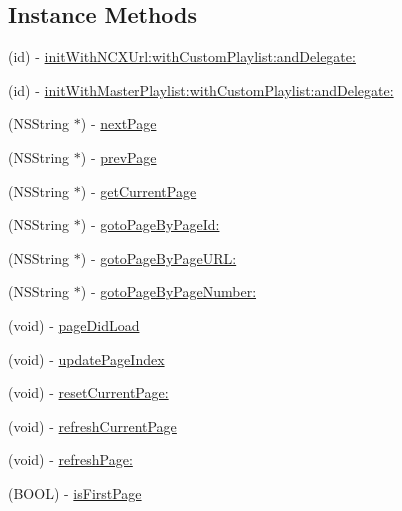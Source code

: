 \subsection*{Instance Methods}
\begin{DoxyCompactItemize}
\item 
(id) -\/ \hyperlink{interface_pxe_player_page_manager_a8f9edd477523edd9403157d3ec4d9272}{init\-With\-N\-C\-X\-Url\-:with\-Custom\-Playlist\-:and\-Delegate\-:}
\item 
(id) -\/ \hyperlink{interface_pxe_player_page_manager_a1acb70790e9716c43ec76ead84660df5}{init\-With\-Master\-Playlist\-:with\-Custom\-Playlist\-:and\-Delegate\-:}
\item 
(N\-S\-String $\ast$) -\/ \hyperlink{interface_pxe_player_page_manager_a2bcb750b8adc89ba486a938a2cd41912}{next\-Page}
\item 
(N\-S\-String $\ast$) -\/ \hyperlink{interface_pxe_player_page_manager_a537e1ae0451bb4bd2505567dd131c0cf}{prev\-Page}
\item 
(N\-S\-String $\ast$) -\/ \hyperlink{interface_pxe_player_page_manager_a498ec415cdee48cf98d3987b27d1e255}{get\-Current\-Page}
\item 
(N\-S\-String $\ast$) -\/ \hyperlink{interface_pxe_player_page_manager_a424c106ea5215cdc09717245ebea3550}{goto\-Page\-By\-Page\-Id\-:}
\item 
(N\-S\-String $\ast$) -\/ \hyperlink{interface_pxe_player_page_manager_aa936790b8353f99bd80ab0a103a617cc}{goto\-Page\-By\-Page\-U\-R\-L\-:}
\item 
(N\-S\-String $\ast$) -\/ \hyperlink{interface_pxe_player_page_manager_a8df6da237f836f15071bb4f89d6341ee}{goto\-Page\-By\-Page\-Number\-:}
\item 
(void) -\/ \hyperlink{interface_pxe_player_page_manager_a3bc250a6d660a4bc896d3a4246acb71a}{page\-Did\-Load}
\item 
(void) -\/ \hyperlink{interface_pxe_player_page_manager_a29541675ce1b0d7ad4eebe09911ad110}{update\-Page\-Index}
\item 
(void) -\/ \hyperlink{interface_pxe_player_page_manager_a280a0550516439315df7c060e55cb381}{reset\-Current\-Page\-:}
\item 
(void) -\/ \hyperlink{interface_pxe_player_page_manager_a8601082d8343001cc1a83ba95c01dc2b}{refresh\-Current\-Page}
\item 
(void) -\/ \hyperlink{interface_pxe_player_page_manager_a84ea3e77704e458a85e6fb141eab5802}{refresh\-Page\-:}
\item 
(B\-O\-O\-L) -\/ \hyperlink{interface_pxe_player_page_manager_a5a1c671b75d0ce7b77750679abf4b740}{is\-First\-Page}

\end{DoxyCompactItemize}
